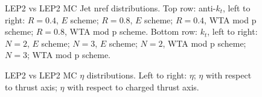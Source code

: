 \begin{figure}[H]
\hfill
\caption{LEP2 vs LEP2 MC Jet nref distributions. Top row: anti-$k_t$, left to right: $R=0.4$, $E$ scheme; $R=0.8$, $E$ scheme; $R=0.4$, WTA mod p scheme; $R=0.8$, WTA mod p scheme. Bottom row: $k_t$, left to right: $N=2$, $E$ scheme; $N=3$, $E$ scheme; $N=2$, WTA mod p scheme; $N=3$; WTA mod p scheme.}  
\end{figure}

\begin{figure}[H]
\centering
{}\hfill
{}\hfill
{}\hfill
\caption{LEP2 vs LEP2 MC $\eta$ distributions. Left to right: $\eta$; $\eta$ with respect to thrust axis; $\eta$ with respect to charged thrust axis.}
\end{figure}

